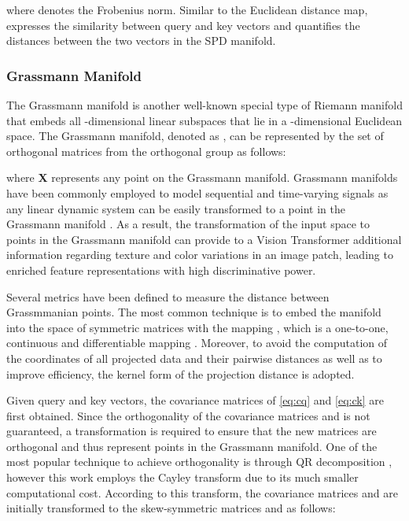 \documentclass[10pt,twocolumn,letterpaper]{article}
\begin{document}
where  denotes the Frobenius norm. Similar to the Euclidean distance map,  expresses the similarity between query and key vectors and quantifies the distances between the two vectors in the SPD manifold.

\subsubsection{Grassmann Manifold}

The Grassmann manifold is another well-known special type of Riemann manifold that embeds all -dimensional linear subspaces that lie in a -dimensional Euclidean space. The Grassmann manifold, denoted as , can be represented by the set of orthogonal matrices from the orthogonal group  as follows:



where \textbf{X} represents any point on the Grassmann manifold. Grassmann manifolds have been commonly employed to model sequential and time-varying signals as any linear dynamic system can be easily transformed to a point in the Grassmann manifold \cite{Author12,Author14}. As a result, the transformation of the input space to points in the Grassmann manifold can provide to a Vision Transformer additional information regarding texture and color variations in an image patch, leading to enriched feature representations with high discriminative power.

Several metrics have been defined to measure the distance between Grassmmanian points. The most common technique is to embed the manifold into the space of symmetric matrices with the mapping , which is a one-to-one, continuous and differentiable mapping \cite{Author31}. Moreover, to avoid the computation of the coordinates of all projected data and their pairwise distances as well as to improve efficiency, the kernel form of the projection distance \cite{Author15} is adopted.

Given query  and key  vectors, the covariance matrices of \eqref{eq:cq} and \eqref{eq:ck} are first obtained. Since the orthogonality of the covariance matrices  and  is not guaranteed, a transformation is required to ensure that the new matrices are orthogonal and thus represent points in the Grassmann manifold. One of the most popular technique to achieve orthogonality is through QR decomposition \cite{Author28}, however this work employs the Cayley transform \cite{Author58} due to its much smaller computational cost. According to this transform, the covariance matrices  and  are initially transformed to the skew-symmetric matrices  and  as follows:
\end{document}
